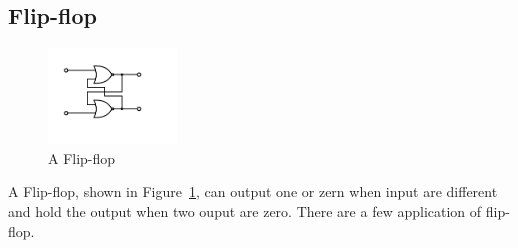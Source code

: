 \documentclass[aps,prl,reprint]{revtex4-1}
\begin{document}
    \subsection{Flip-flop}
        \begin{figure}[h]
            \centering
            \includegraphics[height=1in]{image/Flip-flop.pdf}
            \caption{A Flip-flop}
            \label{fig:flipFlop}
        \end{figure}
        A Flip-flop, shown in Figure~\ref{fig:flipFlop}, can output one or zern when input are different and hold the output when two ouput are zero. There are a few application of flip-flop.
\end{document}
